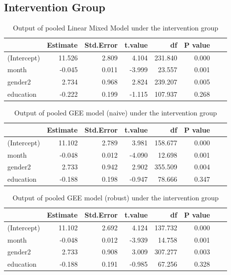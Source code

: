 \subsection{Intervention Group}
\begin{table}[H]
\centering
\begin{tabular}{|l|r|r|r|r|r|r|r|}
\hline
  & Estimate & Std.Error & t.value & df & P value \\
\hline
(Intercept) & 11.526 & 2.809 & 4.104 & 231.840 & 0.000 \\
\hline
month & -0.045 & 0.011 & -3.999 & 23.557 & 0.001 \\
\hline
gender2 & 2.734 & 0.968 & 2.824 & 239.207 & 0.005 \\
\hline
education & -0.222 & 0.199 & -1.115 & 107.937 & 0.268 \\
\hline
\end{tabular}
\caption{Output of pooled Linear Mixed Model under the intervention group}
\label{tab:lme.treatment.mi}
\end{table}

\begin{table}[H]
\centering
\begin{tabular}{|l|r|r|r|r|r|r|r|}
\hline
  & Estimate & Std.Error & t.value & df & P value \\
\hline
(Intercept) & 11.102 & 2.789 & 3.981 & 158.677 & 0.000 \\
\hline
month & -0.048 & 0.012 & -4.090 & 12.698 & 0.001 \\
\hline
gender2 & 2.733 & 0.942 & 2.902 & 355.509 & 0.004 \\
\hline
education & -0.188 & 0.198 & -0.947 & 78.666 & 0.347 \\
\hline
\end{tabular}
\caption{Output of pooled GEE model (naive) under the intervention group}
\label{tab:gee.treatment.mi.naive}
\end{table}

\begin{table}[H]
\centering
\begin{tabular}{|l|r|r|r|r|r|r|r|}
\hline
  & Estimate & Std.Error & t.value & df & P value \\
\hline
(Intercept) & 11.102 & 2.692 & 4.124 & 137.732 & 0.000 \\
\hline
month & -0.048 & 0.012 & -3.939 & 14.758 & 0.001 \\
\hline
gender2 & 2.733 & 0.908 & 3.009 & 307.277 & 0.003 \\
\hline
education & -0.188 & 0.191 & -0.985 & 67.256 & 0.328 \\
\hline
\end{tabular}
\caption{Output of pooled GEE model (robust) under the intervention group}
\label{tab:gee.treatment.mi.robust}
\end{table}

